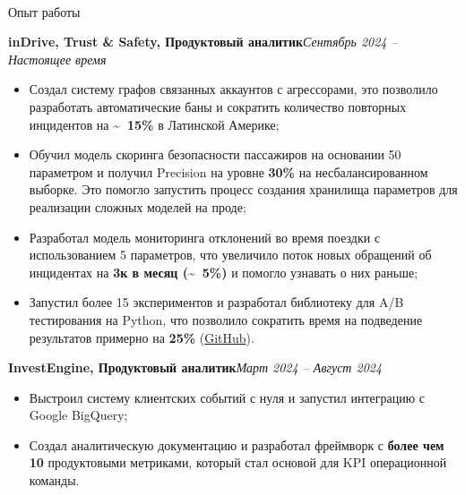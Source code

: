 \documentclass[]{mcdowellcv}
\renewenvironment{cvsubsection}[2]{%
  \begin{adjustwidth}{\subsectionmargin}{\subsectionmargin}%
    {\bfseries #1}\hfill #2\par\vspace{0.5em}%
}{%
  \end{adjustwidth}%
  \vspace*{\aftersubsectionspace}%
}
\renewcommand{\makeheader}{%
  \begin{center}
    \printname\\[0.5em]%
    \printcontacts%
  \end{center}%
  \vspace*{\afterheaderspace}%
}
\begin{document}
    \makeheader
    
    \begin{cvsection}{\Large Опыт работы}
        \begin{cvsubsection}{inDrive, Trust \& Safety, Продуктовый аналитик}{\textit{Сентябрь 2024 -- Настоящее время}}
            \begin{itemize}
                \item Создал систему графов связанных аккаунтов с агрессорами, это позволило разработать автоматические баны и сократить количество повторных инцидентов на \textbf{\textasciitilde ~15\%} в Латинской Америке;
                \item Обучил модель скоринга безопасности пассажиров на основании 50 параметром и получил Precision на уровне \textbf{30\%} на несбалансированном выборке. Это помогло запустить процесс создания хранилища параметров для реализации сложных моделей на проде;
                \item Разработал модель мониторинга отклонений во время поездки с использованием 5 параметров, что увеличило поток новых обращений об инцидентах на \textbf{3к в месяц (\textasciitilde ~5\%)} и помогло узнавать о них раньше;
                \item Запустил более 15 экспериментов и разработал библиотеку для A/B тестирования на Python, что позволило сократить время на подведение результатов примерно на \textbf{25\%} (\href{https://github.com/Renarion/expab}{GitHub}).
            \end{itemize}
        \end{cvsubsection}
        
        \begin{cvsubsection}{InvestEngine, Продуктовый аналитик}{\textit{Март 2024 -- Август 2024}}
            \begin{itemize}
                \item Выстроил систему клиентских событий с нуля и запустил интеграцию с Google BigQuery;
                \item Создал аналитическую документацию и разработал фреймворк с \textbf{более чем 10} продуктовыми метриками, который стал основой для KPI операционной команды.
            \end{itemize}
        \end{cvsubsection}
        

\end{cvsection}
\end{document}
